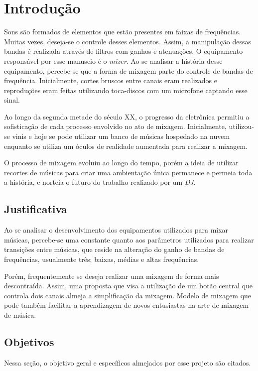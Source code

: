 \chapter[Introdução]{Introdução}

Sons são formados de elementos que estão presentes em faixas de frequências. Muitas vezes, deseja-se o controle desses elementos. Assim, a manipulação dessas bandas é realizada através de filtros com ganhos e atenuações. O equipamento responsável por esse manuseio é o \textit{mixer}.
Ao se analisar a história desse equipamento, percebe-se que a forma de mixagem parte do controle de bandas de frequência. Inicialmente, cortes bruscos entre canais eram realizados e reproduções eram feitas utilizando toca-discos com um microfone captando esse sinal. 

Ao longo da segunda metade do século XX, o progresso da eletrônica permitiu a sofisticação de cada processo envolvido no ato de mixagem. Inicialmente, utilizou-se vinis e hoje se pode utilizar um banco de músicas hospedado na nuvem enquanto se utiliza um óculos de realidade aumentada para realizar a mixagem. 

O processo de mixagem evoluiu ao longo do tempo, porém a ideia de utilizar recortes de músicas para criar uma ambientação única permanece e permeia toda a história, e norteia o futuro do trabalho realizado por um \textit{DJ}.

\section{Justificativa}
Ao se analisar o desenvolvimento dos equipamentos utilizados para mixar músicas, percebe-se uma constante quanto aos parâmetros utilizados para realizar transições entre músicas, que reside na alteração do ganho de bandas de frequências, usualmente três; baixas, médias e altas frequências.

Porém, frequentemente se deseja realizar uma mixagem de forma mais descontraída. Assim, uma proposta que visa a utilização de um botão central que controla dois canais almeja a simplificação da mixagem. Modelo de mixagem que pode também facilitar a aprendizagem de novos entusiastas na arte de mixagem de música.

\section{Objetivos}

Nessa seção, o objetivo geral e específicos almejados por esse projeto são citados.

